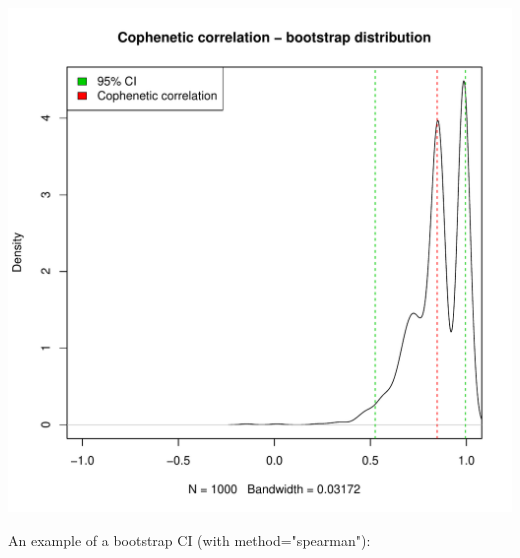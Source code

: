 \documentclass[shortnames,nojss,article]{jss}\usepackage[]{graphicx}\usepackage[]{color}
\makeatletter
\def\maxwidth{ %
  \ifdim\Gin@nat@width>\linewidth
    \linewidth
  \else
    \Gin@nat@width
  \fi
}
\newenvironment{knitrout}{}{} %
\makeatother
\begin{document}
\begin{knitrout}
{\centering \includegraphics[width=\maxwidth]{figure/cor_cophenetic_simulation_CI_3} 

}



\end{knitrout}



An example of a bootstrap CI (with method="spearman"):
\end{document}

